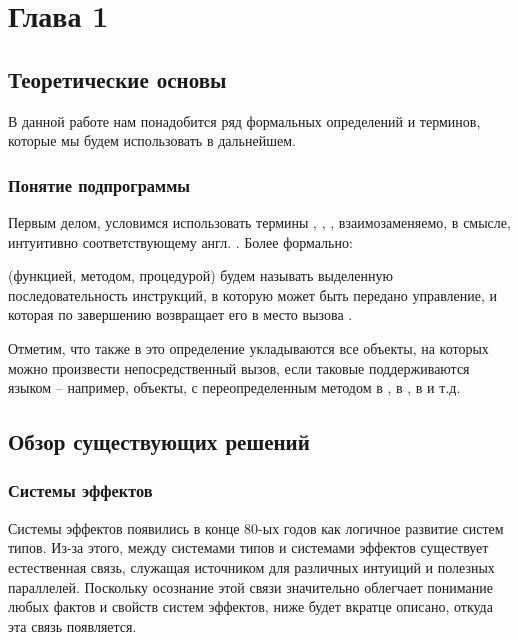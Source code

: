 \section{Глава 1}

\subsection{Теоретические основы}

В данной работе нам понадобится ряд формальных определений и терминов, которые мы будем использовать в дальнейшем. 

\subsubsection{Понятие подпрограммы}

Первым делом, условимся использовать термины , , ,  взаимозаменяемо, в смысле, интуитивно соответствующему англ. . Более формально:

\begin{definition}
     (функцией, методом, процедурой) будем называть выделенную последовательность инструкций, в которую может быть передано управление, и которая по завершению возвращает его в место вызова \cite{Wheeler52}.
\end{definition}

Отметим, что также в это определение укладываются все объекты, на которых можно произвести непосредственный вызов, если таковые поддерживаются языком -- например, объекты, с переопределенным методом  в ,  в ,  в  и т.д.






\newpage



\subsection{Обзор существующих решений}


\subsubsection{Системы эффектов}

Системы эффектов появились в конце 80-ых годов как логичное развитие систем типов. Из-за этого, между системами типов и системами эффектов существует естественная связь, служащая источником для различных интуиций и полезных параллелей. Поскольку осознание этой связи значительно облегчает понимание любых фактов и свойств систем эффектов, ниже будет вкратце описано, откуда эта связь появляется.


